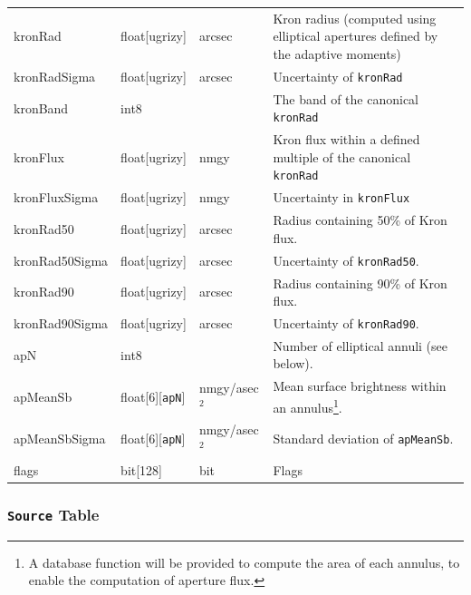 \documentclass[12pt]{article}
\newcommand{\code}[1]{\texttt{#1}}
\newcommand{\Source}{\code{Source}\xspace}
\begin{document}
\begin{center}
\begin{longtable}{p{3cm}p{2cm}p{2cm}p{5cm}}
kronRad & float[ugrizy] & arcsec & Kron radius (computed using elliptical apertures defined by the adaptive moments) \\

kronRadSigma & float[ugrizy] & arcsec & Uncertainty of {\tt kronRad} \\

kronBand & int8 & ~ & The band of the canonical {\tt kronRad} \\

kronFlux & float[ugrizy] & nmgy & Kron flux within a defined multiple of the canonical {\tt kronRad} \\

kronFluxSigma & float[ugrizy] & nmgy & Uncertainty in {\tt kronFlux} \\

kronRad50 & float[ugrizy] & arcsec & Radius containing 50\% of Kron flux. \\

kronRad50Sigma & float[ugrizy] & arcsec & Uncertainty of {\tt kronRad50}. \\

kronRad90 & float[ugrizy] & arcsec & Radius containing 90\% of Kron flux. \\

kronRad90Sigma & float[ugrizy] & arcsec & Uncertainty of {\tt kronRad90}. \\


apN & int8 & ~ & Number of elliptical annuli (see below). \\

apMeanSb & float[6][{\tt apN}] & nmgy/asec$^2$ & Mean surface brightness within an annulus\footnote{A database function will be provided to compute the area of each annulus, to enable the computation of aperture flux.}. \\

apMeanSbSigma & float[6][{\tt apN}] & nmgy/asec$^2$ & Standard deviation of {\tt apMeanSb}. \\

flags & bit[128] & bit & Flags \\ \hline
\end{longtable}
\end{center}





\subsubsection{\Source Table}
\label{sec:sourceTable}
\end{document}
